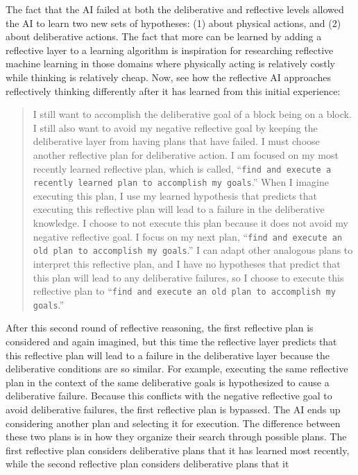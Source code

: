 The fact that the AI failed at both the deliberative and reflective
levels allowed the AI to learn two new sets of hypotheses: (1) about
physical actions, and (2) about deliberative actions.  The fact that
more can be learned by adding a reflective layer to a learning
algorithm is inspiration for researching reflective machine learning
in those domains where physically acting is relatively costly while
thinking is relatively cheap.  Now, see how the reflective AI
approaches reflectively thinking differently after it has learned from
this initial experience:
\begin{quote}
  I still want to accomplish the deliberative goal of a block being on
  a block.  I still also want to avoid my negative reflective goal by
  keeping the deliberative layer from having plans that have failed.
  I must choose another reflective plan for deliberative action.  I am
  focused on my most recently learned reflective plan, which is
  called, ``{\tt{find and execute a recently learned plan to
      accomplish my goals}}.''  When I imagine executing this plan, I
  use my learned hypothesis that predicts that executing this
  reflective plan will lead to a failure in the deliberative
  knowledge.  I choose to not execute this plan because it does not
  avoid my negative reflective goal.  I focus on my next plan,
  ``{\tt{find and execute an old plan to accomplish my goals}}.''  I
  can adapt other analogous plans to interpret this reflective plan,
  and I have no hypotheses that predict that this plan will lead to
  any deliberative failures, so I choose to execute this reflective
  plan to ``{\tt{find and execute an old plan to accomplish my
      goals}}.''
\end{quote}
After this second round of reflective reasoning, the first reflective
plan is considered and again imagined, but this time the reflective
layer predicts that this reflective plan will lead to a failure in the
deliberative layer because the deliberative conditions are so similar.
For example, executing the same reflective plan in the context of the
same deliberative goals is hypothesized to cause a deliberative
failure.  Because this conflicts with the negative reflective goal to
avoid deliberative failures, the first reflective plan is bypassed.
The AI ends up considering another plan and selecting it for
execution.  The difference between these two plans is in how they
organize their search through possible plans.  The first reflective
plan considers deliberative plans that it has learned most recently,
while the second reflective plan considers deliberative plans that it
